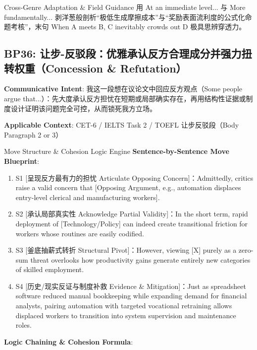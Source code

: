\endgroup
\vspace{4pt}
\begin{TipBox}{Cross-Genre Adaptation \& Field Guidance}
用 At an immediate level... 与 More fundamentally... 剥洋葱般剖析“极低生成摩擦成本”与“奖励表面流利度的公式化命题考核”，末句 When A meets B, C inevitably crowds out D 极具思辨穿透力。
\end{TipBox}
\vspace{8pt}
\subsection{BP36: 让步-反驳段：优雅承认反方合理成分并强力扭转权重（Concession \& Refutation）}\label{sec:bp:BP36}
\noindent\textbf{\color{AcadNavy}Communicative Intent}: 我这一段想在议论文中回应反方观点（Some people argue that...）：先大度承认反方担忧在短期或局部确实存在，再用结构性证据或制度设计证明该问题完全可控，从而锁死我方立场。\par\vspace{2pt}
\noindent\textbf{\color{AcadSlate}Applicable Context}: CET-6 / IELTS Task 2 / TOEFL 让步反驳段（Body Paragraph 2 or 3）\par\vspace{4pt}
\begin{ConceptBox}{Move Structure \& Cohesion Logic Engine}
\textbf{Sentence-by-Sentence Move Blueprint}:
\begin{enumerate}[label=\textbf{\color{AcadNavy}S\arabic*.}, leftmargin=2em, itemsep=2pt]
  \item S1 [呈现反方最有力的担忧 Articulate Opposing Concern]：Admittedly, critics raise a valid concern that [Opposing Argument, e.g., automation displaces entry-level clerical and manufacturing workers].
  \item S2 [承认局部真实性 Acknowledge Partial Validity]：In the short term, rapid deployment of [Technology/Policy] can indeed create transitional friction for workers whose routines are easily codified.
  \item S3 [釜底抽薪式转折 Structural Pivot]：However, viewing [X] purely as a zero-sum threat overlooks how productivity gains generate entirely new categories of skilled employment.
  \item S4 [历史/现实反证与制度补救 Evidence \& Mitigation]：Just as spreadsheet software reduced manual bookkeeping while expanding demand for financial analysts, pairing automation with targeted vocational retraining allows displaced workers to transition into system supervision and maintenance roles.
\end{enumerate}\par\vspace{4pt}
\textbf{Logic Chaining \& Cohesion Formula}:\par{}
\end{ConceptBox}
